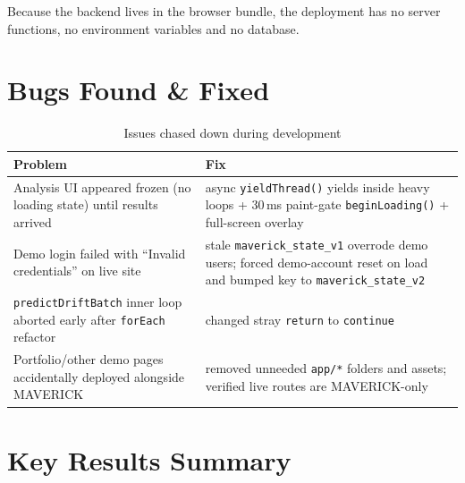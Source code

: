 \documentclass[11pt,a4paper]{article}
\newcommand{\code}[1]{\texttt{\small #1}}
\begin{document}
Because the backend lives in the browser bundle, the deployment has no server functions, no
environment variables and no database.

\section{Bugs Found \& Fixed}
\label{sec:bugs}

\begin{table}[h]
  \centering
  \caption{Issues chased down during development}
  \vspace{0.3cm}
  \begin{tabular}{p{}p{}}
    \toprule
    \textbf{Problem} & \textbf{Fix} \\
    \midrule
    Analysis UI appeared frozen (no loading state) until results arrived &
    async \code{yieldThread()} yields inside heavy loops + 30\,ms paint-gate
    \code{beginLoading()} + full-screen overlay\\
    Demo login failed with ``Invalid credentials'' on live site &
    stale \code{maverick\_state\_v1} overrode demo users; forced demo-account reset
    on load and bumped key to \code{maverick\_state\_v2}\\
    \code{predictDriftBatch} inner loop aborted early after \code{forEach} refactor &
    changed stray \code{return} to \code{continue}\\
    Portfolio/other demo pages accidentally deployed alongside MAVERICK &
    removed unneeded \code{app/*} folders and assets; verified live routes are
    MAVERICK-only\\
    \bottomrule
  \end{tabular}
\end{table}

\section{Key Results Summary}
\label{sec:results}
\end{document}
